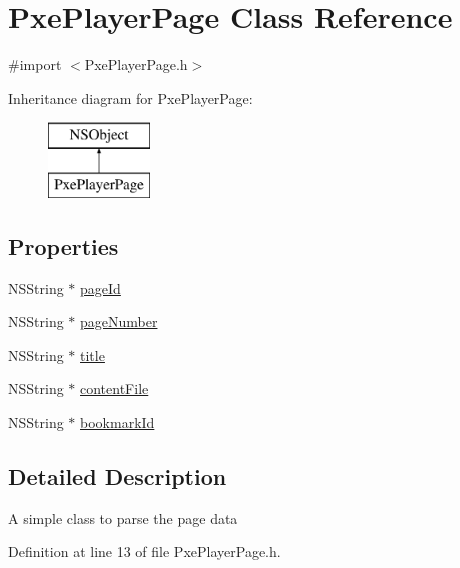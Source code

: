\hypertarget{interface_pxe_player_page}{\section{Pxe\-Player\-Page Class Reference}
\label{interface_pxe_player_page}
}


{\ttfamily \#import $<$Pxe\-Player\-Page.\-h$>$}

Inheritance diagram for Pxe\-Player\-Page\-:\begin{figure}[H]
\begin{center}
\leavevmode
\includegraphics[height=2.000000cm]{interface_pxe_player_page}
\end{center}
\end{figure}
\subsection*{Properties}
\begin{DoxyCompactItemize}
\item 
N\-S\-String $\ast$ \hyperlink{interface_pxe_player_page_a307e00301005f6a1c6efdd92e8b017d7}{page\-Id}
\item 
N\-S\-String $\ast$ \hyperlink{interface_pxe_player_page_a26a65d0db51a76c61b495a34e74bb51a}{page\-Number}
\item 
N\-S\-String $\ast$ \hyperlink{interface_pxe_player_page_aa6d9e50eeb6d3d80141ee442ab5efa1b}{title}
\item 
N\-S\-String $\ast$ \hyperlink{interface_pxe_player_page_acfcb40c67266260146efccbbfdcccab5}{content\-File}
\item 
N\-S\-String $\ast$ \hyperlink{interface_pxe_player_page_abc45c16daa18448f6b62f8659b2b40a8}{bookmark\-Id}
\end{DoxyCompactItemize}


\subsection{Detailed Description}
A simple class to parse the page data 

Definition at line 13 of file Pxe\-Player\-Page.\-h.



